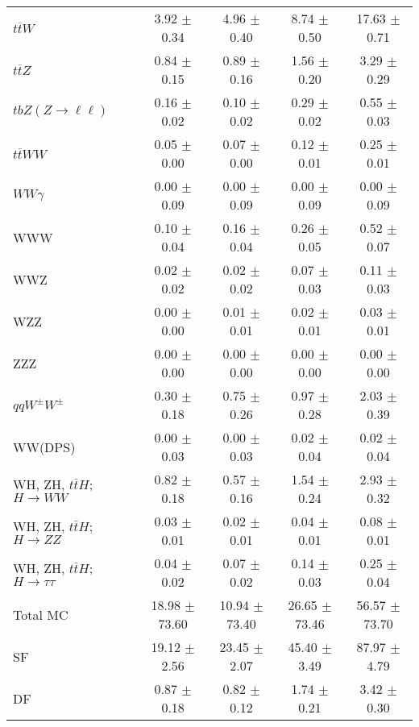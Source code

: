 \begin{tabular}{l|cccc}
                   $t\overline{t}W$ &  3.92 $\pm$  0.34 &  4.96 $\pm$  0.40 &  8.74 $\pm$  0.50 & 17.63 $\pm$  0.71 \\
                   $t\overline{t}Z$ &  0.84 $\pm$  0.15 &  0.89 $\pm$  0.16 &  1.56 $\pm$  0.20 &  3.29 $\pm$  0.29 \\
    $tbZ (Z \rightarrow \ell \ell)$ &  0.16 $\pm$  0.02 &  0.10 $\pm$  0.02 &  0.29 $\pm$  0.02 &  0.55 $\pm$  0.03 \\
                  $t\overline{t}WW$ &  0.05 $\pm$  0.00 &  0.07 $\pm$  0.00 &  0.12 $\pm$  0.01 &  0.25 $\pm$  0.01 \\
                         $WW\gamma$ &  0.00 $\pm$  0.09 &  0.00 $\pm$  0.09 &  0.00 $\pm$  0.09 &  0.00 $\pm$  0.09 \\
                                WWW &  0.10 $\pm$  0.04 &  0.16 $\pm$  0.04 &  0.26 $\pm$  0.05 &  0.52 $\pm$  0.07 \\
                                WWZ &  0.02 $\pm$  0.02 &  0.02 $\pm$  0.02 &  0.07 $\pm$  0.03 &  0.11 $\pm$  0.03 \\
                                WZZ &  0.00 $\pm$  0.00 &  0.01 $\pm$  0.01 &  0.02 $\pm$  0.01 &  0.03 $\pm$  0.01 \\
                                ZZZ &  0.00 $\pm$  0.00 &  0.00 $\pm$  0.00 &  0.00 $\pm$  0.00 &  0.00 $\pm$  0.00 \\
                 $qqW^{\pm}W^{\pm}$ &  0.30 $\pm$  0.18 &  0.75 $\pm$  0.26 &  0.97 $\pm$  0.28 &  2.03 $\pm$  0.39 \\
                            WW(DPS) &  0.00 $\pm$  0.03 &  0.00 $\pm$  0.03 &  0.02 $\pm$  0.04 &  0.02 $\pm$  0.04 \\
WH, ZH, $t\bar{t}H$; $H \rightarrow WW$ &  0.82 $\pm$  0.18 &  0.57 $\pm$  0.16 &  1.54 $\pm$  0.24 &  2.93 $\pm$  0.32 \\
WH, ZH, $t\bar{t}H$; $H \rightarrow ZZ$ &  0.03 $\pm$  0.01 &  0.02 $\pm$  0.01 &  0.04 $\pm$  0.01 &  0.08 $\pm$  0.01 \\
WH, ZH, $t\bar{t}H$; $H \rightarrow \tau\tau$ &  0.04 $\pm$  0.02 &  0.07 $\pm$  0.02 &  0.14 $\pm$  0.03 &  0.25 $\pm$  0.04 \\
\hline\hline
                           Total MC & 18.98 $\pm$ 73.60 & 10.94 $\pm$ 73.40 & 26.65 $\pm$ 73.46 & 56.57 $\pm$ 73.70 \\
\hline
                                 SF & 19.12 $\pm$  2.56 & 23.45 $\pm$  2.07 & 45.40 $\pm$  3.49 & 87.97 $\pm$  4.79 \\
                                 DF &  0.87 $\pm$  0.18 &  0.82 $\pm$  0.12 &  1.74 $\pm$  0.21 &  3.42 $\pm$  0.30 \\

\end{tabular}

